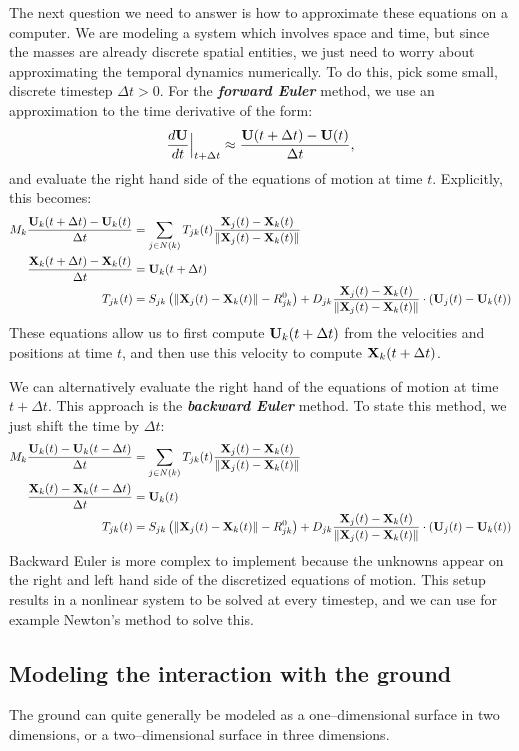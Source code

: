 \documentclass[10pt]{article}
\begin{document}
The next question we need to answer is how to approximate these equations on a computer.  We are modeling a system which involves space and time, but since the masses are already discrete spatial entities, we just need to worry about approximating the temporal dynamics numerically.  To do this, pick some small, discrete timestep $\Delta t > 0$.  For the {\bf \em forward Euler} method, we use an approximation to the time derivative of the form:
\begin{align*}
\frac{d {\bf U}}{dt}\Big|_{t + \Delta t} \approx \frac{{\bf U}(t+\Delta t ) - {\bf U}(t)}{\Delta t},
\end{align*}
and evaluate the right hand side of the equations of motion at time $t$.  Explicitly, this becomes:
\begin{align*}
M_k \frac{{\bf U}_k(t + \Delta t) - {\bf U}_k(t)}{\Delta t} &= \sum_{j \in N(k)} T_{jk}(t) \frac{{\bf X}_j(t) - {\bf X}_k(t)}{\| {\bf X}_j(t) - {\bf X}_k(t) \|} \\
\frac{{\bf X}_k(t + \Delta t) - {\bf X}_k(t)}{\Delta t} &= {\bf U}_k(t + \Delta t) \\
T_{jk}(t) &= S_{jk} \left( \|{\bf X}_j(t) - {\bf X}_k(t)\| - R^0_{jk} \right) + D_{jk} \frac{{\bf X}_j(t) - {\bf X}_k(t)}{\|{\bf X}_j(t) - {\bf X}_k(t)\|} \cdot ({\bf U}_j(t) - {\bf U}_k(t))
\end{align*}
These equations allow us to first compute ${\bf U}_k(t + \Delta t)$ from the velocities and positions at time $t$, and then use this velocity to compute ${\bf X}_k(t + \Delta t)$. 

We can alternatively evaluate the right hand of the equations of motion at time $t + \Delta t$.  This approach is the {\bf \em backward Euler} method.  To state this method, we just shift the time by $\Delta t$:
\begin{align*}
M_k \frac{{\bf U}_k(t) - {\bf U}_k(t- \Delta t)}{\Delta t} &= \sum_{j \in N(k)} T_{jk}(t) \frac{{\bf X}_j(t) - {\bf X}_k(t)}{\| {\bf X}_j(t) - {\bf X}_k(t) \|} \\
\frac{{\bf X}_k(t) - {\bf X}_k(t - \Delta t)}{\Delta t} &= {\bf U}_k(t) \\
T_{jk}(t) &= S_{jk} \left( \|{\bf X}_j(t) - {\bf X}_k(t)\| - R^0_{jk} \right) + D_{jk} \frac{{\bf X}_j(t) - {\bf X}_k(t)}{\|{\bf X}_j(t) - {\bf X}_k(t)\|} \cdot ({\bf U}_j(t) - {\bf U}_k(t))
\end{align*}
Backward Euler is more complex to implement because the unknowns appear on the right and left hand side of the discretized equations of motion.  This setup results in a nonlinear system to be solved at every timestep, and we can use for example Newton's method to solve this.

\subsection{Modeling the interaction with the ground}

The ground can quite generally be modeled as a one--dimensional surface in two dimensions, or a two--dimensional surface in three dimensions.
\end{document}
